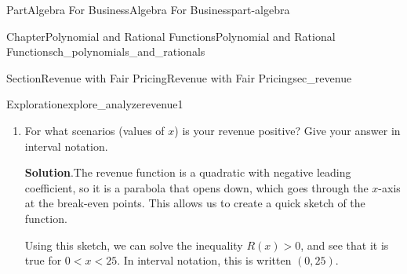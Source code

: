 \documentclass[oneside,10pt,]{tufte-book}
\newcommand{\blocktitlefont}{\relax}
\numberwithin{equation}{chapter}
\newcommand{\lt}{<}
\newcommand{\gt}{>}
\newcommand{\amp}{&}
\begin{document}
\begin{partptx}{Part}{Algebra For Business}{}{Algebra For Business}{}{}{part-algebra}
\begin{chapterptx}{Chapter}{Polynomial and Rational Functions}{}{Polynomial and Rational Functions}{}{}{ch_polynomials_and_rationals}
\begin{sectionptx}{Section}{Revenue with Fair Pricing}{}{Revenue with Fair Pricing}{}{}{sec_revenue}
\begin{exploration}{Exploration}{}{explore_analyzerevenue1}
\begin{enumerate}[font=\bfseries,label=(\alph*),ref=\alph*]
\begin{descriptionlist}
\begin{dlimedium}{Solving by Factoring}{explore_analyzerevenue1-2-2-2-1-2}
\par
To find the second point, solve the second equation for \(x\)%
\begin{align*}
-0.4x \amp + 10 \amp = \amp 0  \\
\amp - 10 \amp \amp - 10 \\
\amp \\
-0.4x \amp \amp  = \amp -10  \\
\div -0.4 \amp \amp \div -0.4 \\
\amp \\
x \amp \amp = \amp 25
\end{align*}
%
\par
The revenue equals zero when \(x=0\) or \(x=25\).%
\end{dlimedium}%
\end{descriptionlist}
%
\item{}For what scenarios (values of \(x\)) is your revenue positive? Give your answer in interval notation.%
\par\smallskip%
\noindent\textbf{\blocktitlefont Solution}.\hypertarget{explore_analyzerevenue1-3-2}{}\quad{}The revenue function is a quadratic with negative leading coefficient, so it is a parabola that opens down, which goes through the \(x\)-axis at the break-even points.  This allows us to create a quick sketch of the function.%
\par
Using this sketch, we can solve the inequality \(R(x)\gt 0\), and see that it is true for \(0\lt x \lt 25\).  In interval notation, this is written \((0,25)\).%
\begin{image}{0.25}{0.5}{0.25}{}%
\end{image}
\end{enumerate}
\end{exploration}
\end{sectionptx}
\end{chapterptx}
\end{partptx}
\end{document}
